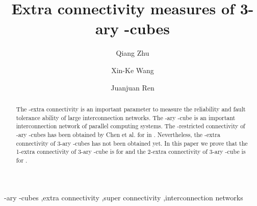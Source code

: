 \documentclass[preprint,number,12pt]{elsarticle}
\begin{document}
\newtheorem{thm}{Theorem}
\newtheorem{lem}[thm]{Lemma}
\newtheorem{cor}{Corollary }
\begin{frontmatter}





\title{Extra connectivity measures of 3-ary -cubes}


\author[xidian]{Qiang Zhu}
\author[xidian]{Xin-Ke Wang}
\author[lgd]{Juanjuan Ren}



\address[xidian]{Department of Mathematics, Xidian University, Xi'an, Shanxi 710071, China}
\address[lgd]{School of Management Science, Xian University of Technology, Xi'an Shanxi 710023, China}



\begin{abstract}
The -extra connectivity is an important parameter to measure the reliability and fault tolerance ability of large interconnection networks. The -ary -cube is an important interconnection network of parallel computing systems. The -restricted connectivity of -ary -cubes has been obtained by Chen et al. for  in \cite{Chen2007-p1848-1855}. Nevertheless, the -extra connectivity of 3-ary -cubes has not been obtained yet. In this paper we prove that  the 1-extra connectivity  of 3-ary -cube is  for  and the 2-extra connectivity  of 3-ary -cube is  for .
\end{abstract}

\begin{keyword}
-ary -cubes \sep extra connectivity \sep super connectivity \sep interconnection networks




\end{keyword}

\end{frontmatter}
\end{document}
